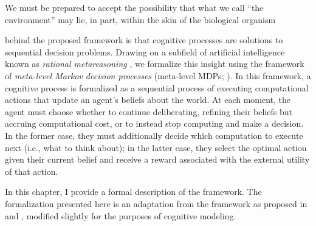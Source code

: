 \begin{savequote}[75mm]
We must be prepared to accept the possibility that what we call ``the environment'' may lie, in part, within the skin of the biological organism
\end{savequote}


 behind the proposed framework is that cognitive processes are solutions to sequential decision problems. Drawing on a subfield of artificial intelligence known as \emph{rational metareasoning} \citep{matheson1968economic,russell1991principles}, we formalize this insight using the framework of \emph{meta-level Markov decision processes} (meta-level MDPs; \citealp{hay2012selecting}). In this framework, a cognitive process is formalized as a sequential process of executing computational actions that update an agent's beliefs about the world. At each moment, the agent must choose whether to continue deliberating, refining their beliefs but accruing computational cost, or to instead stop computing and make a decision. In the former case, they must additionally decide which computation to execute next (i.e., what to think about); in the latter case, they select the optimal action given their current belief and receive a reward associated with the external utility of that action.

In this chapter, I provide a formal description of the framework. The formalization presented here is an adaptation from the framework as proposed in \citet{hay2016selecting} and \citet{hay2016selecting}, modified slightly for the purposes of cognitive modeling.



